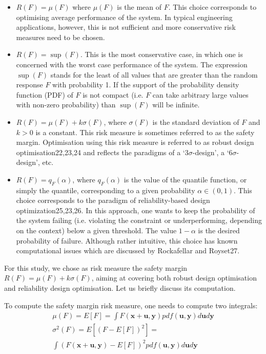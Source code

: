 \documentclass[10pt,twocolumn,a4paper]{article}
\begin{document}
\begin{itemize}
  \item $R(F)=\mu(F)$ where $\mu(F)$ is the mean of $F$. This choice corresponds to optimising average performance of the system. In typical engineering applications, however, this is not sufficient and more conservative risk measures need to be chosen.
  \item $R(F)=\sup(F)$. This is the most conservative case, in which one is concerned with the worst case performance of the system. The expression $\sup(F)$ stands for the least of all values that are greater than the random response $F$ with probability 1. If the support of the probability density function (PDF) of $F$ is not compact (i.e. $F$ can take arbitrary large values with non-zero probability) than $\sup(F)$ will be infinite.
  \item $R(F)=\mu(F)+k\sigma(F)$, where $\sigma(F)$ is the standard deviation of $F$ and $k>0$ is a constant. This risk measure is sometimes referred to as the safety margin. Optimisation using this risk measure is referred to as robust design optimisation22,23,24 and reflects the paradigms of a ‘$3\sigma$-design’, a ‘$6\sigma$-design’, etc.
  \item $R(F)=q_F(\alpha)$, where $q_F(\alpha)$ is the value of the quantile function, or simply the quantile, corresponding to a given probability $\alpha\in (0,1)$. This choice corresponds to the paradigm of reliability-based design optimization25,23,26. In this approach, one wants to keep the probability of the system failing (i.e. violating the constraint or underperforming, depending on the context) below a given threshold. The value $1-\alpha$ is the desired probability of failure. Although rather intuitive, this choice has known computational issues which are discussed by Rockafellar and Royset27.
\end{itemize}

For this study, we chose as risk measure the safety margin $R(F)=\mu(F)+k\sigma(F)$, aiming at covering both robust design optimisation and reliability design optimisation. Let us briefly discuss its computation.

To compute the safety margin risk measure, one needs to compute two integrals:
\begin{displaymath}
  \begin{array}{c}
    \mu (F)=E[F]=\int F(\pmb x + \pmb u, \pmb y)p df(\pmb u, \pmb y)d\pmb u d\pmb y \\
    \sigma^2(F)=E[(F-E[F])^2]=\\\int(F(\pmb x + \pmb u, \pmb y)-E[F])^2 p df(\pmb u, \pmb y)d\pmb u d\pmb y
  \end{array}
\end{displaymath}
\end{document}
